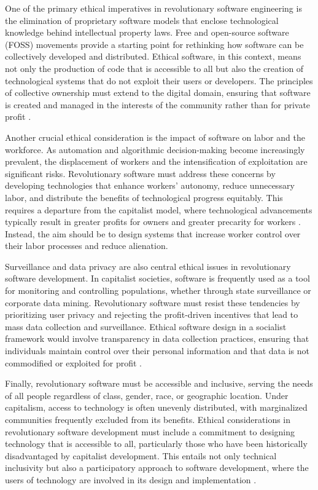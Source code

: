 \begin{refsection}
One of the primary ethical imperatives in revolutionary software engineering is the elimination of proprietary software models that enclose technological knowledge behind intellectual property laws. Free and open-source software (FOSS) movements provide a starting point for rethinking how software can be collectively developed and distributed. Ethical software, in this context, means not only the production of code that is accessible to all but also the creation of technological systems that do not exploit their users or developers. The principles of collective ownership must extend to the digital domain, ensuring that software is created and managed in the interests of the community rather than for private profit \cite[pp.~94]{stallman2002foss}.

Another crucial ethical consideration is the impact of software on labor and the workforce. As automation and algorithmic decision-making become increasingly prevalent, the displacement of workers and the intensification of exploitation are significant risks. Revolutionary software must address these concerns by developing technologies that enhance workers' autonomy, reduce unnecessary labor, and distribute the benefits of technological progress equitably. This requires a departure from the capitalist model, where technological advancements typically result in greater profits for owners and greater precarity for workers \cite[pp.~211]{benanav2020automation}. Instead, the aim should be to design systems that increase worker control over their labor processes and reduce alienation.

Surveillance and data privacy are also central ethical issues in revolutionary software development. In capitalist societies, software is frequently used as a tool for monitoring and controlling populations, whether through state surveillance or corporate data mining. Revolutionary software must resist these tendencies by prioritizing user privacy and rejecting the profit-driven incentives that lead to mass data collection and surveillance. Ethical software design in a socialist framework would involve transparency in data collection practices, ensuring that individuals maintain control over their personal information and that data is not commodified or exploited for profit \cite[pp.~45]{zuboff2019surveillance}.

Finally, revolutionary software must be accessible and inclusive, serving the needs of all people regardless of class, gender, race, or geographic location. Under capitalism, access to technology is often unevenly distributed, with marginalized communities frequently excluded from its benefits. Ethical considerations in revolutionary software development must include a commitment to designing technology that is accessible to all, particularly those who have been historically disadvantaged by capitalist development. This entails not only technical inclusivity but also a participatory approach to software development, where the users of technology are involved in its design and implementation \cite[pp.~67]{noble2018algorithms}.


\end{refsection}
